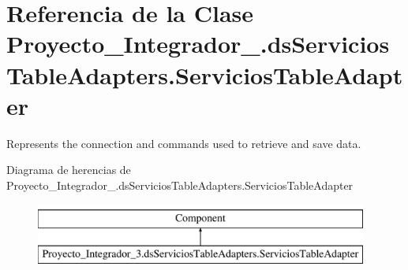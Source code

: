 \hypertarget{class_proyecto___integrador__3_1_1ds_servicios_table_adapters_1_1_servicios_table_adapter}{\section{Referencia de la Clase Proyecto\-\_\-\-Integrador\-\_.\-ds\-Servicios\-Table\-Adapters.\-Servicios\-Table\-Adapter}
\label{class_proyecto___integrador__3_1_1ds_servicios_table_adapters_1_1_servicios_table_adapter}
}


Represents the connection and commands used to retrieve and save data.  


Diagrama de herencias de Proyecto\-\_\-\-Integrador\-\_.\-ds\-Servicios\-Table\-Adapters.\-Servicios\-Table\-Adapter\begin{figure}[H]
\begin{center}
\leavevmode
\includegraphics[height=2.000000cm]{class_proyecto___integrador__3_1_1ds_servicios_table_adapters_1_1_servicios_table_adapter}
\end{center}
\end{figure}
